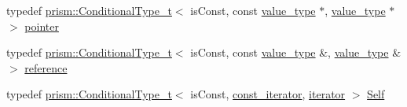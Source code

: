 \begin{DoxyCompactItemize}
\item 
typedef \hyperlink{type__traits_8h_ac3a08b98dd60c2b8253333ee25753cb4}{prism\+::\+Conditional\+Type\+\_\+t}$<$ is\+Const, const \hyperlink{structprism_1_1_associative_iterator_a9708a3c0f7299fcdb2c668a3366b304a}{value\+\_\+type} $\ast$, \hyperlink{structprism_1_1_associative_iterator_a9708a3c0f7299fcdb2c668a3366b304a}{value\+\_\+type} $\ast$ $>$ \hyperlink{structprism_1_1_associative_iterator_a8fcf3ad67041397687eb5ae187312d17}{pointer}
\item 
typedef \hyperlink{type__traits_8h_ac3a08b98dd60c2b8253333ee25753cb4}{prism\+::\+Conditional\+Type\+\_\+t}$<$ is\+Const, const \hyperlink{structprism_1_1_associative_iterator_a9708a3c0f7299fcdb2c668a3366b304a}{value\+\_\+type} \&, \hyperlink{structprism_1_1_associative_iterator_a9708a3c0f7299fcdb2c668a3366b304a}{value\+\_\+type} \& $>$ \hyperlink{structprism_1_1_associative_iterator_aab7cac291580847e204cb7c8ca90ddc8}{reference}
\item 
typedef \hyperlink{type__traits_8h_ac3a08b98dd60c2b8253333ee25753cb4}{prism\+::\+Conditional\+Type\+\_\+t}$<$ is\+Const, \hyperlink{structprism_1_1_associative_iterator_ab372de0dedeecc03d00f577af3380ef2}{const\+\_\+iterator}, \hyperlink{structprism_1_1_associative_iterator_a1c18ef8b4a02324bfdbf541b023ecc6b}{iterator} $>$ \hyperlink{structprism_1_1_associative_iterator_af8bb51b69b4eca7c0ec7ba4887833877}{Self}
\end{DoxyCompactItemize}
